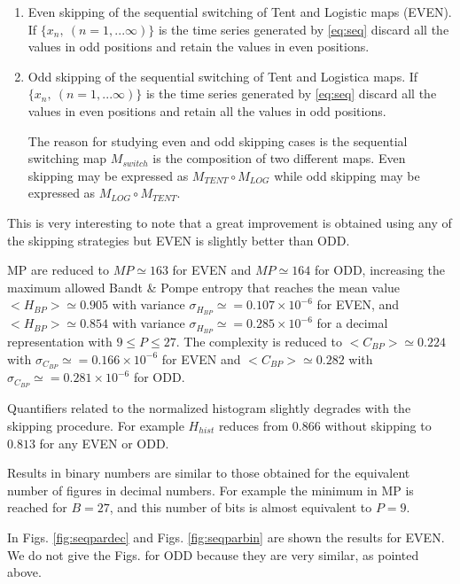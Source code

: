 \begin{enumerate}
\begin{enumerate}
\item Even skipping of the sequential switching of Tent and Logistic maps (EVEN).\\
If $\{x_n,~(n=1,...\infty)\}$ is the time series generated by \ref{eq:seq} discard all the values in odd positions and retain the values in even positions.
\item Odd skipping of the sequential switching of Tent and Logistica maps.
If $\{x_n,~(n=1,...\infty)\}$ is the time series generated by \ref{eq:seq} discard all the values in even positions and retain all the values in odd positions.

The reason for studying even and odd skipping cases is the sequential switching map $M_{switch}$ is the composition of two different maps. Even skipping may be expressed as $M_{TENT}\circ M_{LOG}$ while odd skipping may be expressed as $M_{LOG}\circ M_{TENT}$.
\end{enumerate}
This is very interesting to note that a great improvement is obtained using any of the skipping strategies but EVEN is slightly better than ODD.  

MP are reduced to $MP\simeq 163$ for EVEN and $MP\simeq 164$ for ODD, increasing the maximum allowed Bandt \& Pompe entropy that reaches the mean value $<H_{BP}>\simeq 0.905$ with variance $\sigma_{H_{BP}}\simeq=0.107 \times 10^{-6}$ for EVEN, and $<H_{BP}>\simeq 0.854$ with variance $\sigma_{H_{BP}}\simeq=0.285 \times 10^{-6}$ for a decimal representation with  $9\leq P\leq27$. The complexity is reduced to $<C_{BP}>\simeq 0.224$ with $\sigma_{C_{BP}}\simeq=0.166 \times 10^{-6}$ for EVEN and  $<C_{BP}>\simeq 0.282$ with $\sigma_{C_{BP}}\simeq=0.281 \times 10^{-6}$ for ODD.

Quantifiers related to the normalized histogram slightly degrades with the skipping procedure. For example $H_{hist}$ reduces from $0.866$ without skipping to $0.813$ for any EVEN or ODD. 

Results in binary numbers are similar to those obtained for the equivalent number of figures in decimal numbers. For example the minimum in MP is reached for $B=27$, and this number of bits is almost equivalent to $P=9$. 
\end{enumerate}
In Figs. \ref{fig:seqpardec} and Figs. \ref{fig:seqparbin} are shown the results for EVEN. We do not give the Figs. for ODD because they are very similar, as pointed above. 
%
